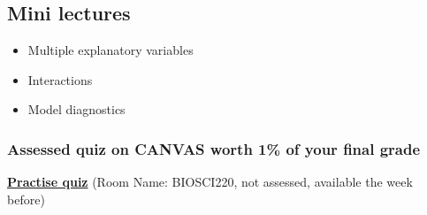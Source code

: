 \documentclass{article}
\begin{document}
\subsection*{Mini lectures}

\begin{itemize}
\item Multiple explanatory variables
\item Interactions
\item Model diagnostics
\end{itemize}

\subsubsection*{Assessed quiz on CANVAS worth 1\% of your final grade}
\begin{center}
  \href{https://b.socrative.com/login/student/}{\textbf{\Large Practise quiz}} (Room Name: BIOSCI220, not assessed, available the week before)
  
\end{center}
\end{document}
